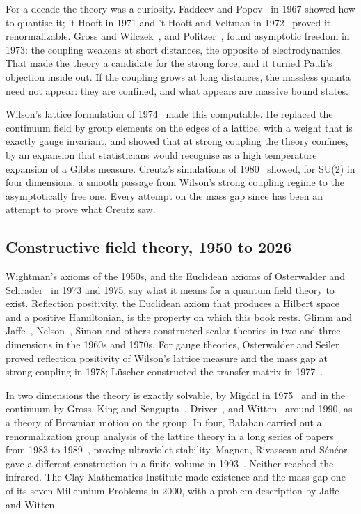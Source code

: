 For a decade the theory was a curiosity. Faddeev and Popov~\cite{FP67} in 1967 showed how to quantise it; 't Hooft in 1971 and 't Hooft and Veltman in 1972~\cite{tH71a,tH71,tHV72} proved it renormalizable. Gross and Wilczek~\cite{GW73}, and Politzer~\cite{Po73}, found asymptotic freedom in 1973: the coupling weakens at short distances, the opposite of electrodynamics. That made the theory a candidate for the strong force, and it turned Pauli's objection inside out. If the coupling grows at long distances, the massless quanta need not appear: they are confined, and what appears are massive bound states.

Wilson's lattice formulation of 1974~\cite{Wi74} made this computable. He replaced the continuum field by group elements on the edges of a lattice, with a weight that is exactly gauge invariant, and showed that at strong coupling the theory confines, by an expansion that statisticians would recognise as a high temperature expansion of a Gibbs measure. Creutz's simulations of 1980~\cite{Cr80} showed, for SU(2) in four dimensions, a smooth passage from Wilson's strong coupling regime to the asymptotically free one. Every attempt on the mass gap since has been an attempt to prove what Creutz saw.

\subsection{Constructive field theory, 1950 to 2026}

Wightman's axioms of the 1950s, and the Euclidean axioms of Osterwalder and Schrader~\cite{OS} in 1973 and 1975, say what it means for a quantum field theory to exist. Reflection positivity, the Euclidean axiom that produces a Hilbert space and a positive Hamiltonian, is the property on which this book rests. Glimm and Jaffe~\cite{GJ}, Nelson~\cite{Ne73}, Simon and others constructed scalar theories in two and three dimensions in the 1960s and 1970s. For gauge theories, Osterwalder and Seiler~\cite{OSe} proved reflection positivity of Wilson's lattice measure and the mass gap at strong coupling in 1978; L\"uscher constructed the transfer matrix in 1977~\cite{Lu77}.

In two dimensions the theory is exactly solvable, by Migdal in 1975~\cite{Mi75} and in the continuum by Gross, King and Sengupta~\cite{GKS89}, Driver~\cite{Dr89}, and Witten~\cite{Wi91} around 1990, as a theory of Brownian motion on the group. In four, Ba\l aban carried out a renormalization group analysis of the lattice theory in a long series of papers from 1983 to 1989~\cite{Ba87}, proving ultraviolet stability. Magnen, Rivasseau and S\'en\'eor gave a different construction in a finite volume in 1993~\cite{MRS}. Neither reached the infrared. The Clay Mathematics Institute made existence and the mass gap one of its seven Millennium Problems in 2000, with a problem description by Jaffe and Witten~\cite{JW}.

